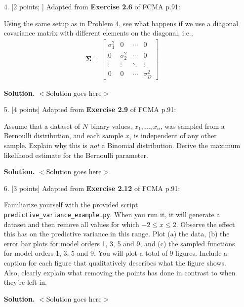 \documentclass[10pt]{article}
\begin{document}
\begin{itemize}
{\bf Solution.} $<$Solution goes here$>$



\item[4.] [2 points; \boldred{Required only for Graduates}]
Adapted from {\bf Exercise 2.6} of FCMA p.91:

Using the same setup as in Problem 4, see what happens if we use a diagonal covariance matrix with different elements on the diagonal, i.e.,
\begin{eqnarray*}
\mathbf{\Sigma} = 
\begin{bmatrix}
\sigma_1^2 & 0 & \cdots & 0 \\
0 & \sigma_2^2 & \cdots & 0 \\
\vdots & \vdots & \ddots & \vdots \\
0 & 0 & \cdots & \sigma_D^2
\end{bmatrix}
\end{eqnarray*}

{\bf Solution.} $<$Solution goes here$>$



\item[5.] [4 points]
Adapted from {\bf Exercise 2.9} of FCMA p.91:

Assume that a dataset of $N$ binary values, $x_1, ..., x_n$, was sampled from a Bernoulli distribution, and each sample $x_i$ is independent of any other sample.  Explain why this is {\em not} a Binomial distribution.  Derive the maximum likelihood estimate for the Bernoulli parameter.

{\bf Solution.} $<$Solution goes here$>$



\item[6.] [3 points]
Adapted from {\bf Exercise 2.12} of FCMA p.91:

Familiarize yourself with the provided script {\tt predictive\_variance\_example.py}.  When you run it, it will generate a dataset and then remove all values for which $-2 \leq x \leq 2$.  Observe the effect this has on the predictive variance in this range.  Plot (a) the data, (b) the error bar plots for model orders 1, 3, 5 and 9, and (c) the sampled functions for model orders 1, 3, 5 and 9.  You will plot a total of 9 figures.  Include a caption for each figure that qualitatively describes what the figure shows.  Also, clearly explain what removing the points has done in contrast to when they're left in.

{\bf Solution.} $<$Solution goes here$>$


\end{itemize}
\end{document}
